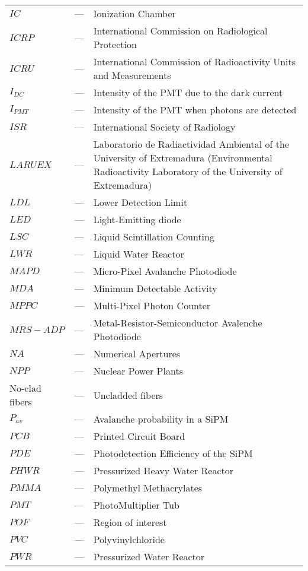 \begin{longtable}{p{25mm} c p{120mm} }
$IC$ & --- & Ionization Chamber\\
$ICRP$ & --- & International Commission on Radiological Protection \\
$ICRU$ & --- & International Commission of Radioactivity Units 
\newline
and Measurements\\
$I_{DC}$ & --- & Intensity of the PMT due to the dark current\\
$I_{PMT}$ & --- & Intensity of the PMT when photons are detected\\
$ISR$ & --- & International Society of Radiology \\
$LARUEX$ & --- & Laboratorio de Radiactividad Ambiental of the University
\newline
of Extremadura (Environmental Radioactivity Laboratory
\newline
of the University of Extremadura)\\
$LDL$ & --- & Lower Detection Limit\\
$LED$ & --- & Light-Emitting diode \\
$LSC$ & --- & Liquid Scintillation Counting\\
$LWR$ & --- & Liquid Water Reactor\\
$MAPD$ & --- & Micro-Pixel Avalanche Photodiode\\
$MDA$ & --- & Minimum Detectable Activity\\
$MPPC$ & --- & Multi-Pixel Photon Counter\\
$MRS-ADP$ & --- & Metal-Resistor-Semiconductor Avalenche Photodiode\\
$NA$ & --- & Numerical Apertures\\
$NPP$ & --- & Nuclear Power Plants\\
No-clad fibers & --- & Uncladded fibers\\
$P_{av}$ & --- & Avalanche probability in a SiPM\\
$PCB$ & --- & Printed Circuit Board\\
$PDE$ & --- & Photodetection Efficiency of the SiPM\\
$PHWR$ & --- & Pressurized Heavy Water Reactor\\
$PMMA$ & --- & Polymethyl Methacrylates\\
$PMT$ & --- & PhotoMultiplier Tub\\
$POF$ & --- & Region of interest\\
$PVC$ & --- & Polyvinylchloride\\
$PWR$ & --- & Pressurized Water Reactor\\

\end{longtable}
